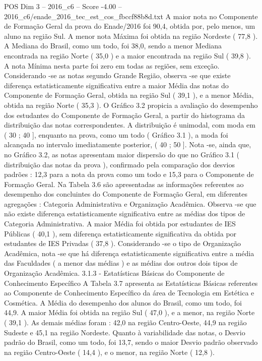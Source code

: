 \begin{textsample}{POS Dim 3 – 2016\_c6 – Score -4.00 – 2016\_c6/enade\_2016\_tec\_est\_cos\_fbccf88b8d.txt}
A maior nota no Componente de Formação Geral da prova do Enade/2016 foi 90,4, obtida por, pelo menos, um aluno na região Sul.
A menor nota Máxima foi obtida na região Nordeste ( 77,8 ).
A Mediana do Brasil, como um todo, foi 38,0, sendo a menor Mediana encontrada na região Norte ( 35,0 ) e a maior encontrada na região Sul ( 39,8 ).
A nota Mínima nesta parte foi zero em todas as regiões, sem exceção.
Considerando -se as notas segundo Grande Região, observa -se que existe diferença estatisticamente significativa entre a maior Média das notas do Componente de Formação Geral, obtida na região Sul ( 39,1 ), e a menor Média, obtida na região Norte ( 35,3 ).
O Gráfico 3.2 propicia a avaliação do desempenho dos estudantes do Componente de Formação Geral, a partir do histograma da distribuição das notas correspondentes.
A distribuição é unimodal, com moda em ( 30 ; 40 ], enquanto na prova, como um todo ( Gráfico 3.1 ), a moda foi alcançada no intervalo imediatamente posterior, ( 40 ; 50 ].
Nota -se, ainda que, no Gráfico 3.2, as notas apresentam maior dispersão do que no Gráfico 3.1 ( distribuição das notas da prova ), confirmado pela comparação dos desvios padrões : 12,3 para a nota da prova como um todo e 15,3 para o Componente de Formação Geral.
Na Tabela 3.6 são apresentadas as informações referentes ao desempenho dos concluintes do Componente de Formação Geral, em diferentes agregações : Categoria Administrativa e Organização Acadêmica.
Observa -se que não existe diferença estatisticamente significativa entre as médias dos tipos de Categoria Administrativa.
A maior Média foi obtida por estudantes de IES Públicas ( 40,1 ), sem diferença estatisticamente significativa da obtida por estudantes de IES Privadas ( 37,8 ).
Considerando -se o tipo de Organização Acadêmica, nota -se que há diferença estatisticamente significativa entre a média das Faculdades ( a menor das médias ) e as médias dos outros dois tipos de Organização Acadêmica. 3.1.3 - Estatísticas Básicas do Componente de Conhecimento Específico A Tabela 3.7 apresenta as Estatísticas Básicas referentes ao Componente de Conhecimento Específico da área de Tecnologia em Estética e Cosmética.
A Média do desempenho dos alunos do Brasil, como um todo, foi 44,9.
A maior Média foi obtida na região Sul ( 47,0 ), e a menor, na região Norte ( 39,1 ).
As demais médias foram : 42,0 na região Centro-Oeste, 44,9 na região Sudeste e 45,1 na região Nordeste.
Quanto à variabilidade das notas, o Desvio padrão do Brasil, como um todo, foi 13,7, sendo o maior Desvio padrão observado na região Centro-Oeste ( 14,4 ), e o menor, na região Norte ( 12,8 ).

\end{textsample}
